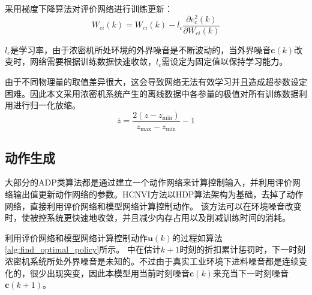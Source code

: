 采用梯度下降算法对评价网络进行训练更新：
\begin{equation}
\label{equ:train_critic} W_{ci}(k)=W_{ci}(k)-l_{c} \frac{\partial
e_{c }^{2}(k)}{\partial W_{ci}(k)}
\end{equation}

$l_c$是学习率，由于浓密机所处环境的外界噪音是不断波动的，当外界噪音$\pmb
c(k)$改变时，网络需要根据训练数据快速收敛，$l_c$需设定为固定值以保持学习能力。

由于不同物理量的取值差异很大，这会导致网络无法有效学习并且造成超参数设定困难。因此本文采用浓密机系统产生的离线数据中各参量的极值对所有训练数据利用进行归一化放缩。
\begin{equation}
\label{equ:normalize} \overline{z}=\frac{2\left(z-z_{\min
}\right)}{z_{\max }-z_{\min }}-1
\end{equation}

\subsection{动作生成}
大部分的ADP类算法都是通过建立一个动作网络来计算控制输入，并利用评价网络输出值更新动作网络的参数。HCNVI方法以HDP算法架构为基础，去掉了动作网络，直接利用评价网络和模型网络计算控制动作。
该方法可以在环境噪音改变时，使被控系统更快速地收敛，并且减少内存占用以及削减训练时间的消耗。

利用评价网络和模型网络计算控制动作${\pmb
u}(k)$的过程如算法\ref{alg:find_optimal_policy}所示。
中在估计$k+1$时刻的折扣累计惩罚时，下一时刻浓密机系统所处外界噪音是未知的。不过由于真实工业环境下进料噪音都是连续变化的，很少出现突变，因此本模型用当前时刻噪音$\pmb
c(k)$来充当下一时刻噪音$\pmb c(k+1)$。

